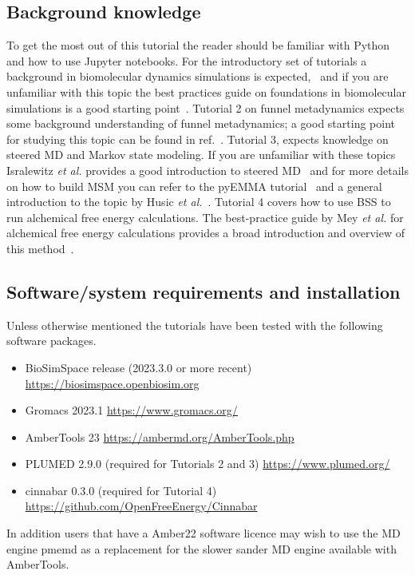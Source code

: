\documentclass[9pt,tutorial]{livecoms}
\begin{document}
\subsection{Background knowledge}
To get the most out of this tutorial the reader should be familiar with Python and how to use Jupyter notebooks. For the introductory set of tutorials a background in biomolecular dynamics simulations is expected,~\cite{Huggins2018} and if you are unfamiliar with this topic the best practices guide on foundations in biomolecular simulations is a good starting point~\cite{Braun2019}. Tutorial 2 on funnel metadynamics expects some background understanding of funnel metadynamics; a good starting point for studying this topic can be found in ref.~\cite{Limongelli2013}. Tutorial 3, expects knowledge on steered MD and Markov state modeling. If you are unfamiliar with these topics Isralewitz \textit{et al.} provides a good introduction to steered MD~\cite{Isralewitz2001} and for more details on how to build MSM you can refer to the pyEMMA tutorial~\cite{Wehmeyer_2019} and a general introduction to the topic by Husic \textit{et al.}~\cite{sMD_Husic-msm}.
Tutorial 4 covers how to use BSS to run alchemical free energy calculations. The best-practice guide by Mey \textit{et al.} for alchemical free energy calculations provides a broad introduction and overview of this method~\cite{mey2020best}.

\subsection{Software/system requirements and installation}

Unless otherwise mentioned the tutorials have been tested with the following 
software packages.

\begin{itemize}
    \item BioSimSpace release (2023.3.0 or more recent)  \url{https://biosimspace.openbiosim.org}
    \item Gromacs 2023.1 \url{https://www.gromacs.org/}
    \item AmberTools 23  \url{https://ambermd.org/AmberTools.php}
    \item PLUMED 2.9.0 (required for Tutorials 2 and 3) \url{https://www.plumed.org/}
    \item cinnabar 0.3.0 (required for Tutorial 4) \url{https://github.com/OpenFreeEnergy/Cinnabar} 
\end{itemize}

In addition users that have a Amber22 software licence may wish to use the MD engine pmemd as a replacement for the slower sander MD engine available with AmberTools.
\end{document}
